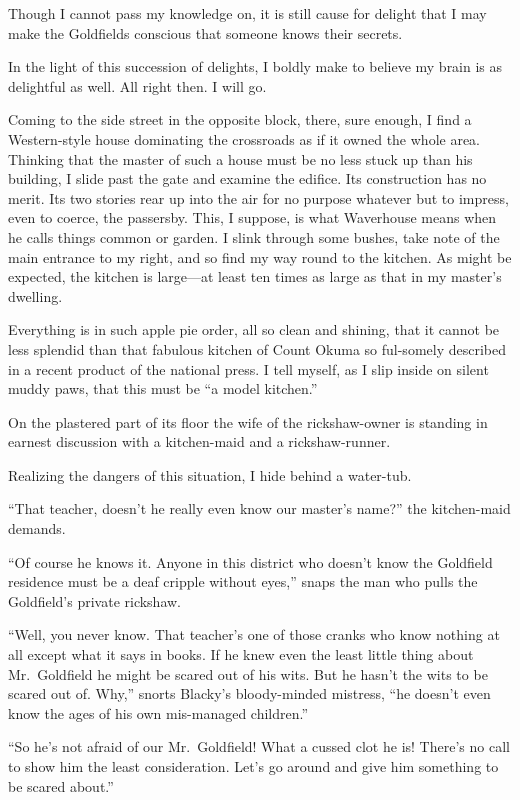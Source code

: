 \documentclass[12pt, openright]{book}
\begin{document}
Though I cannot pass my knowledge on, it is still cause for delight that
I may make the Goldfields conscious that someone knows their secrets.

In the light of this succession of delights, I boldly make to believe my
brain is as delightful as well. All right then. I will go.

Coming to the side street in the opposite block, there, sure enough, I
find a Western-style house dominating the crossroads as if it owned the
whole area. Thinking that the master of such a house must be no less
stuck up than his building, I slide past the gate and examine the
edifice. Its construction has no merit. Its two stories rear up into the
air for no purpose whatever but to impress, even to coerce, the
passersby. This, I suppose, is what Waverhouse means when he calls
things common or garden. I slink through some bushes, take note of the
main entrance to my right, and so find my way round to the kitchen. As
might be expected, the kitchen is large---at least ten times as large as
that in my master's dwelling.

Everything is in such apple pie order, all so clean and shining, that it
cannot be less splendid than that fabulous kitchen of Count Okuma so
ful-somely described in a recent product of the national press. I tell
myself, as I slip inside on silent muddy paws, that this must be ``a
model kitchen.''

On the plastered part of its floor the wife of the rickshaw-owner is
standing in earnest discussion with a kitchen-maid and a
rickshaw-runner.

Realizing the dangers of this situation, I hide behind a water-tub.

``That teacher, doesn't he really even know our master's name?'' the
kitchen-maid demands.

``Of course he knows it. Anyone in this district who doesn't know the
Goldfield residence must be a deaf cripple without eyes,'' snaps the man
who pulls the Goldfield's private rickshaw.

``Well, you never know. That teacher's one of those cranks who know
nothing at all except what it says in books. If he knew even the least
little thing about Mr.~Goldfield he might be scared out of his wits. But
he hasn't the wits to be scared out of. Why,'' snorts Blacky's
bloody-minded mistress, ``he doesn't even know the ages of his own
mis-managed children.''

``So he's not afraid of our Mr.~Goldfield! What a cussed clot he is!
There's no call to show him the least consideration. Let's go around and
give him something to be scared about.''
\end{document}
